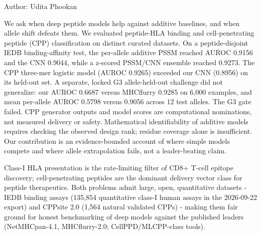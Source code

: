 

Author: Udita Phookan


We ask when deep peptide models help against additive baselines, and when allele shift defeats them. We evaluated peptide-HLA binding and cell-penetrating peptide (CPP) classification on distinct curated datasets. On a peptide-disjoint IEDB binding-affinity test, the per-allele additive PSSM reached AUROC 0.9156 and the CNN 0.9044, while a z-scored PSSM/CNN ensemble reached 0.9273. The CPP three-mer logistic model (AUROC 0.9265) exceeded our CNN (0.8956) on its held-out set. A separate, locked G3 allele-held-out challenge did not generalize: our AUROC 0.6687 versus MHCflurry 0.9285 on 6,000 examples, and mean per-allele AUROC 0.5798 versus 0.9056 across 12 test alleles. The G3 gate failed. CPP generator outputs and model scores are computational nominations, not measured delivery or safety. Mathematical identifiability of additive models requires checking the observed design rank; residue coverage alone is insufficient. Our contribution is an evidence-bounded account of where simple models compete and where allele extrapolation fails, not a leader-beating claim.


Class-I HLA presentation is the rate-limiting filter of CD8+ T-cell epitope discovery; cell-penetrating peptides are the dominant delivery vector class for peptide therapeutics. Both problems admit large, open, quantitative datasets - IEDB binding assays (135,854 quantitative class-I human assays in the 2026-09-22 export) and CPPsite 2.0 (1,564 natural validated CPPs) - making them fair ground for honest benchmarking of deep models against the published leaders (NetMHCpan-4.1, MHCflurry-2.0; CellPPD/MLCPP-class tools).

